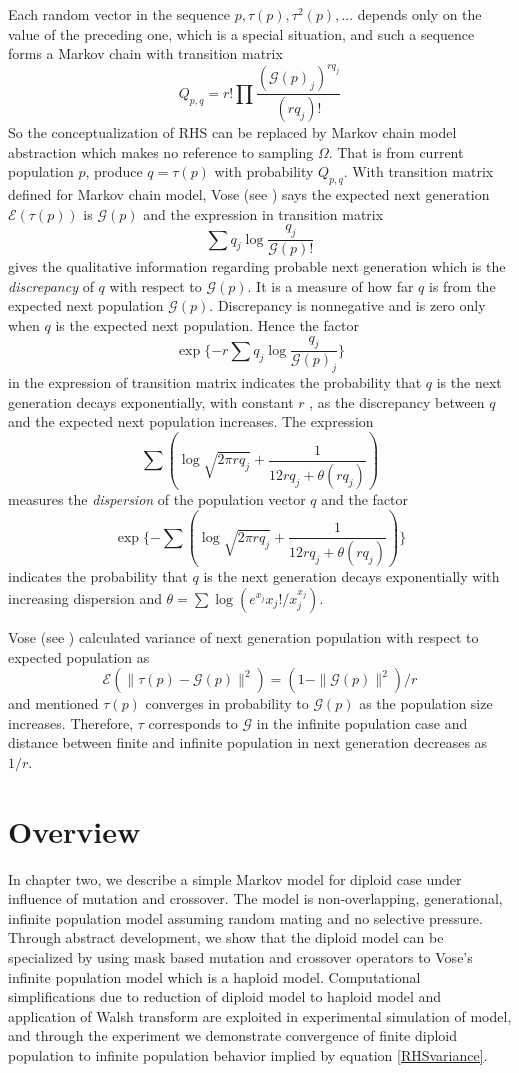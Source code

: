 Each random vector in the sequence $p, \tau(p), \tau^2(p),...$ depends only on the value of the preceding one, which is a special situation, and such a sequence forms a Markov chain with
transition matrix
\[
Q_{p,q} = r! \prod \frac{(\mathcal{G}(p)_j)^{rq_j}}{(rq_j)!}
\]
So the conceptualization of RHS can be replaced by Markov chain model abstraction which makes no reference to sampling $\Omega$. That is from current population $p$, produce $q = \tau (p)$ with probability $Q_{p,q}$. With transition matrix defined for Markov chain model, Vose (see \cite{Vose1999}) says the expected next generation $\mathcal{E}(\tau (p))$ is $\mathcal{G}(p)$ and the expression in transition matrix
\[
\sum q_j \log \frac{q_j}{\mathcal{G}(p)!}
\]
gives the qualitative information regarding probable next generation which is the {\em discrepancy} of $q$ with respect to $\mathcal{G}(p)$. It is a measure of how far $q$ is from the expected next population $\mathcal{G}(p)$. Discrepancy is nonnegative and is zero only when $q$ is the expected next population. Hence the factor 
\[
\exp\{-r \sum q_j \log \frac{q_j}{\mathcal{G}(p)_j}\}
\]
in the expression of transition matrix indicates the probability that $q$ is the next generation
decays exponentially, with constant $r$ , as the discrepancy between $q$ and the
expected next population increases.
The expression 
\[
\sum (\log \sqrt{2 \pi rq_j} + \frac{1}{12rq_j + \theta (rq_j)})
\]
measures the {\em dispersion} of the population vector $q$ and the factor
\[
\exp\{- \sum (\log \sqrt{2 \pi rq_j} + \frac{1}{12rq_j + \theta (rq_j)})\}
\]
indicates the probability that $q$ is the next generation decays exponentially with increasing dispersion and 
$\theta  =  \sum \log(e^{x_j}x_j!/x_j^{x_j})$.

Vose (see \cite{Vose1999}) calculated variance of next generation population with respect to expected population as 
\begin{equation}
\label{RHSvariance}
\mathcal{E}(\| \tau (p) - \mathcal{G}(p) \|^2) = (1 - \|\mathcal{G}(p)\|^2) / r
\end{equation}
and mentioned $\tau (p)$ converges in probability to $\mathcal{G}(p)$ as the population size increases. Therefore, $\tau$ corresponds to $\mathcal{G}$ in the infinite
population case and distance between finite and infinite population in next generation decreases as $1/r$.

\section{Overview}
In chapter two, we describe a simple Markov model for diploid case under influence of mutation and crossover. The model is non-overlapping, generational, infinite population model assuming random mating and no selective pressure. Through abstract development, we show that the diploid model can be specialized by using mask based mutation and crossover operators to Vose's infinite population model which is a haploid model. Computational simplifications due to reduction of diploid model to haploid model and application of Walsh transform are exploited in experimental simulation of model, and through the experiment we demonstrate convergence of finite diploid population to infinite population behavior implied by equation \ref{RHSvariance}.

